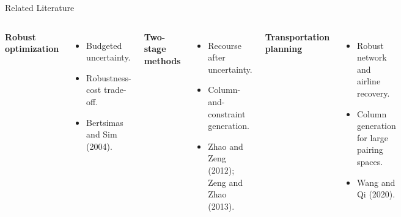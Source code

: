 \documentclass[aspectratio=169]{beamer}
\begin{document}
\begin{frame}{Related Literature}
  \begin{columns}[T,onlytextwidth]
      \textbf{Robust optimization}
      \begin{itemize}
        \item Budgeted uncertainty.
        \item Robustness-cost trade-off.
        \item Bertsimas and Sim (2004).
      \end{itemize}

      \textbf{Two-stage methods}
      \begin{itemize}
        \item Recourse after uncertainty.
        \item Column-and-constraint generation.
        \item Zhao and Zeng (2012); Zeng and Zhao (2013).
      \end{itemize}

      \textbf{Transportation planning}
      \begin{itemize}
        \item Robust network and airline recovery.
        \item Column generation for large pairing spaces.
        \item Wang and Qi (2020).
      \end{itemize}
  \end{columns}
\end{frame}
\end{document}
